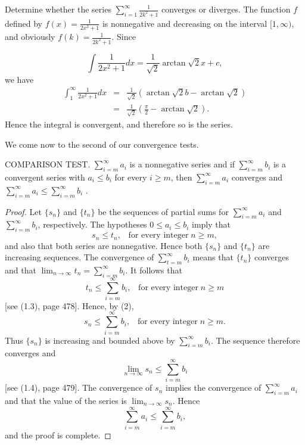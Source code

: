 \begin{example} Determine whether the series $\sum_{i=1}^\infty \frac{1}{2k^2 + 1}$ converges or diverges. The function $f$ defined by $f(x) = \frac{1}{2x^2 + 1}$ is nonnegative and decreasing on the interval $[1, \infty)$, and obviously $f(k) = \frac{1}{2k^2 + 1}$. Since 

$$
\int \frac{1}{2x^2 + 1} dx = \frac{1}{\sqrt 2} \arctan \sqrt 2 x + c, 
$$
\noindent we have 
\begin{eqnarray*}
\int_1^\infty \frac{1}{2x^2 + 1} dx &=& \frac{1}{\sqrt 2} (\arctan \sqrt{2} b - \arctan \sqrt 2)\\
&=& \frac{1}{\sqrt 2} (\frac{\pi}{2} - \arctan \sqrt 2) .
\end{eqnarray*}
\noindent Hence the integral is convergent, and therefore so is the series.
\end{example}

We come now to the second of our convergence tests.

\begin{theorem} %
COMPARISON TEST. $\sum_{i=m}^\infty a_i$ is a nonnegative series and if $\sum_{i=m}^\infty b_i$ is a convergent series with $a_i \leq b_i$ for every $i \geq m$, then $\sum_{i=m}^\infty a_i$ converges and $\sum_{i=m}^\infty a_i \leq \sum_{i=m}^\infty b_i$ .
\end{theorem}

\begin{proof}
Let $\{s_n\}$ and $\{t_n\}$ be the sequences of partial sums for $\sum_{i=m}^\infty a_i$ and $\sum_{i=m}^\infty b_i$, respectively. The hypotheses $0 \leq a_i \leq b_i$ imply that
\begin{equation}
s_n \leq t_n, \;\;\;\mbox{for every integer}\; n \geq m,   
\label{eq9.3.2}
\end{equation}
and also that both series are nonnegative. Hence both $\{s_n\}$ and $\{t_n\}$ are increasing sequences. The convergence of $\sum_{t=m}^\infty b_i$ means that $\{t_n\}$ converges and that $\lim_{n \rightarrow \infty} t_n = \sum_{i=m}^\infty b_i$. It follows that
$$
t_n \leq \sum_{i=m}^\infty b_i, \;\;\;\mbox{for every integer}\; n \geq m  
$$
[see (1.3), page 478]. Hence, by (2),
$$
s_n \leq \sum_{i=m}^\infty b_i, \;\;\;\mbox{for every integer}\; n \geq m.
$$
Thus $\{s_n\}$ is increasing and bounded above by $\sum_{i=m}^\infty b_i$. The sequence therefore converges and
$$
\lim_{n \rightarrow \infty} s_n \leq \sum_{i=m}^\infty b_i 
$$
[see (1.4), page 479]. The convergence of $s_n$ implies the convergence of
$\sum_{i=m}^\infty a_i$ and that the value of the series is $\lim_{n \rightarrow \infty} s_n$. Hence 
$$
\sum_{i=m}^\infty a_i \leq \sum_{i=m}^\infty b_i,
$$
and the proof is complete.
\end{proof}

